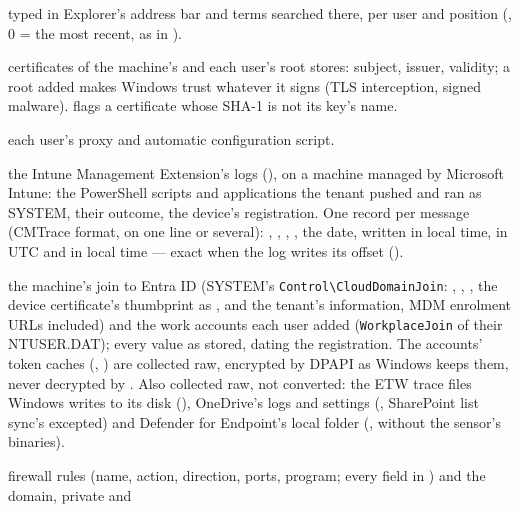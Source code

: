 \documentclass[11pt,a4paper,oneside]{report}
\begin{document}
\begin{description}[style=nextline,leftmargin=1.2em]
        typed in Explorer's address bar and terms searched there, per user and
        position (, 0 = the most recent, as in
        ).
  \item[\fichier{root\_certificates.json}] certificates of the machine's and each
        user's root stores: subject, issuer, validity; a root added makes Windows
        trust whatever it signs (TLS interception, signed malware).
         flags a certificate whose SHA-1 is not its
        key's name.
  \item[\fichier{internet\_settings.json}] each user's proxy and automatic
        configuration script.
  \item[\fichier{intune\_logs.json}] the Intune Management Extension's logs
        (),
        on a machine managed by Microsoft Intune: the PowerShell scripts and
        applications the tenant pushed and ran as SYSTEM, their outcome, the
        device's registration. One record per message (CMTrace format, on
        one line or several): , ,
        , , the date, written in local time, in UTC
        and in local time — exact when the log writes its offset
        ().
  \item[\fichier{cloud\_identity.json}] the machine's join to Entra ID
        (SYSTEM's \texttt{Control\textbackslash CloudDomainJoin}:
        , , , the device
        certificate's thumbprint as , and the tenant's
        information, MDM enrolment URLs included) and the work accounts each
        user added (\texttt{WorkplaceJoin} of their NTUSER.DAT); every value
        as stored,  dating the registration. The
        accounts' token caches (,
        ) are collected raw, encrypted by
        DPAPI as Windows keeps them, never decrypted by \wac{}. Also collected
        raw, not converted: the ETW trace files Windows writes to its disk
        (), OneDrive's logs and settings (,
        SharePoint list sync's excepted) and Defender for Endpoint's local
        folder (, without the sensor's binaries).
  \item[\fichier{firewall.json}] firewall rules (name, action, direction, ports,
        program; every field in ) and the domain, private and

\end{description}
\end{document}
